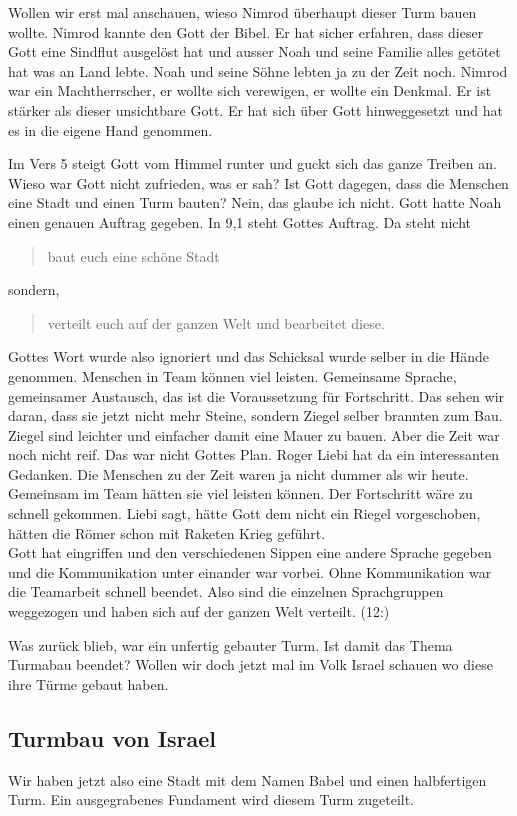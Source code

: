 \documentclass[14pt]{../../inc/mybib}
\renewcommand{\q}{\blockquote}[#1]{}
\begin{document}
    Wollen wir erst mal anschauen, wieso Nimrod überhaupt dieser Turm bauen wollte. Nimrod kannte den Gott der Bibel. Er hat sicher erfahren, dass dieser Gott eine Sindflut ausgelöst hat und ausser Noah und seine Familie alles getötet hat was an Land lebte. Noah und seine Söhne lebten ja zu der Zeit noch. Nimrod war ein Machtherrscher, er wollte sich verewigen, er wollte ein Denkmal. Er ist stärker als dieser unsichtbare Gott. Er hat sich über Gott hinweggesetzt und hat es in die eigene Hand genommen.
    
    Im Vers 5 steigt Gott vom Himmel runter und guckt sich das ganze Treiben an. Wieso war Gott nicht zufrieden, was er sah? Ist Gott dagegen, dass die Menschen eine Stadt und einen Turm bauten? Nein, das glaube ich nicht. Gott hatte Noah einen genauen Auftrag gegeben. In 9,1 steht Gottes Auftrag. Da steht nicht \q{ baut euch eine schöne Stadt} sondern, \q{verteilt euch auf der ganzen Welt und bearbeitet diese.} Gottes Wort wurde also ignoriert und das Schicksal wurde selber in die Hände genommen. Menschen in Team können viel leisten. Gemeinsame Sprache, gemeinsamer Austausch, das ist die Voraussetzung für Fortschritt. Das sehen wir daran, dass sie jetzt nicht mehr Steine, sondern Ziegel selber brannten zum Bau. Ziegel sind leichter und einfacher damit eine Mauer zu bauen. Aber die Zeit war noch nicht reif. Das war nicht Gottes Plan. Roger Liebi hat da ein interessanten Gedanken. Die Menschen zu der Zeit waren ja nicht dummer als wir heute. Gemeinsam im Team hätten sie viel leisten können. Der Fortschritt wäre zu schnell gekommen. Liebi sagt, hätte Gott dem nicht ein Riegel vorgeschoben, hätten die Römer schon mit Raketen Krieg geführt.\\
    Gott hat eingriffen und den verschiedenen Sippen eine andere Sprache gegeben und die Kommunikation unter einander war vorbei. Ohne Kommunikation war die Teamarbeit schnell beendet. Also sind die einzelnen Sprachgruppen weggezogen und haben sich auf der ganzen Welt verteilt. (12:)

    Was zurück blieb, war ein unfertig gebauter Turm. Ist damit das Thema Turmabau beendet? Wollen wir doch jetzt mal im Volk Israel schauen wo diese ihre Türme gebaut haben.
    
    \subsection{Turmbau von Israel}
    Wir haben jetzt also eine Stadt mit dem Namen Babel und einen halbfertigen Turm. Ein ausgegrabenes Fundament wird diesem Turm zugeteilt. 
\end{document}
